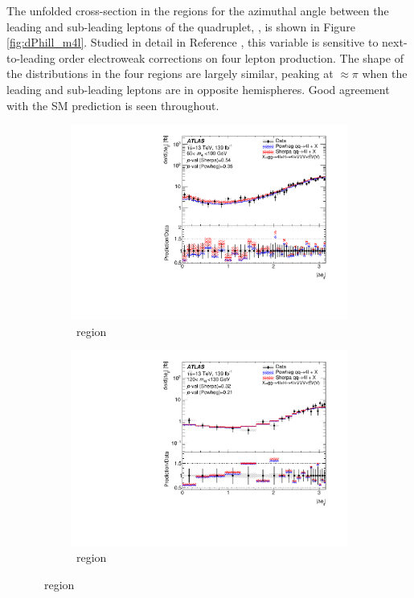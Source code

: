 The unfolded cross-section in the \mFourL{} regions for the azimuthal angle between the leading and sub-leading leptons of the quadruplet, \dPhill{}, is shown in Figure \ref{fig:dPhill_m4l}. Studied in detail in Reference \cite{Gutschow_2021}, this variable is sensitive to next-to-leading order electroweak corrections on four lepton production. The shape of the distributions in the four regions are largely similar, peaking at \dPhill{}$\approx\pi$ when the leading and sub-leading leptons are in opposite hemispheres. Good agreement with the SM prediction is seen throughout. 
\begin{figure}[htb!]
    \begin{subfigure}{.49\textwidth}\centering
      \includegraphics[width=.99\linewidth]{Figures/m4l/UnfoldedResults/Unfolded_Data_deltaPhiLeadingLeptons_m4l60-100.pdf}\caption{\ZFourL \ region}\label{fig:sub-first}
    \end{subfigure}
    \begin{subfigure}{.49\textwidth}\centering
      \includegraphics[width=.99\linewidth]{Figures/m4l/UnfoldedResults/Unfolded_Data_deltaPhiLeadingLeptons_m4l120-130.pdf} \caption{\HFourL \ region}\label{fig:sub-second}

\end{subfigure}
\end{figure}
